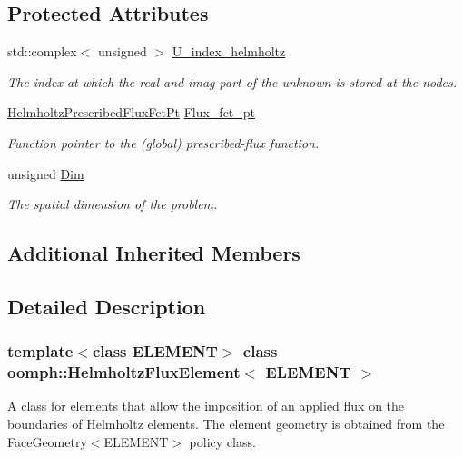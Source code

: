 \subsection*{Protected Attributes}
\begin{DoxyCompactItemize}
\item 
std\+::complex$<$ unsigned $>$ \hyperlink{classoomph_1_1HelmholtzFluxElement_ac5fd419a34614c3ae7a784faa28b773e}{U\+\_\+index\+\_\+helmholtz}
\begin{DoxyCompactList}\small\item\em The index at which the real and imag part of the unknown is stored at the nodes. \end{DoxyCompactList}\item 
\hyperlink{classoomph_1_1HelmholtzFluxElement_ad53ce405c551a39ac9baeaaab7f254df}{Helmholtz\+Prescribed\+Flux\+Fct\+Pt} \hyperlink{classoomph_1_1HelmholtzFluxElement_a28e520786dcd619f8e362356f9492728}{Flux\+\_\+fct\+\_\+pt}
\begin{DoxyCompactList}\small\item\em Function pointer to the (global) prescribed-\/flux function. \end{DoxyCompactList}\item 
unsigned \hyperlink{classoomph_1_1HelmholtzFluxElement_a5d1b709d1f2120ca7a8429bc0260bcc0}{Dim}
\begin{DoxyCompactList}\small\item\em The spatial dimension of the problem. \end{DoxyCompactList}\end{DoxyCompactItemize}
\subsection*{Additional Inherited Members}


\subsection{Detailed Description}
\subsubsection*{template$<$class E\+L\+E\+M\+E\+NT$>$\newline
class oomph\+::\+Helmholtz\+Flux\+Element$<$ E\+L\+E\+M\+E\+N\+T $>$}

A class for elements that allow the imposition of an applied flux on the boundaries of Helmholtz elements. The element geometry is obtained from the Face\+Geometry$<$\+E\+L\+E\+M\+E\+N\+T$>$ policy class. 

